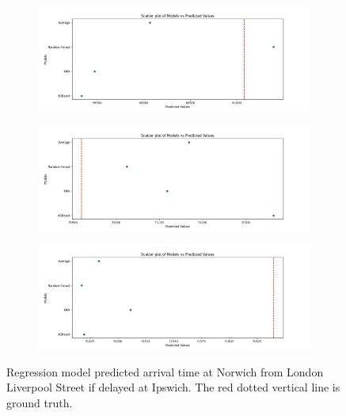 \begin{figure}[!htbp]
    \centering
    \begin{subfigure}[b]{\textwidth}
        \includegraphics[width=\textwidth]{../regression_model/plots/Comparison/Scatter plot of Models vs Predicted Value 61080.jpeg}
        \caption[short]{}
        \label{}
    \end{subfigure}
    \par
    \begin{subfigure}[b]{\textwidth}
        \includegraphics[width=\textwidth]{../regression_model/plots/Comparison/Scatter plot of Models vs Predicted Value 70920.jpeg}
        \caption[short]{}
        \label{}
    \end{subfigure}
    \par
    \begin{subfigure}[b]{\textwidth}
        \includegraphics[width=\textwidth]{../regression_model/plots/Comparison/Scatter plot of Models vs Predicted Value 71640.jpeg}
        \caption[short]{}
        \label{}
    \end{subfigure}
    \caption[short]{Regression model predicted arrival time at Norwich from London Liverpool Street if delayed at Ipswich. The red dotted vertical line is ground truth.}
    \label{fig: Regression model predicted arrival time at Norwich from London Liverpool Street}
\end{figure}

